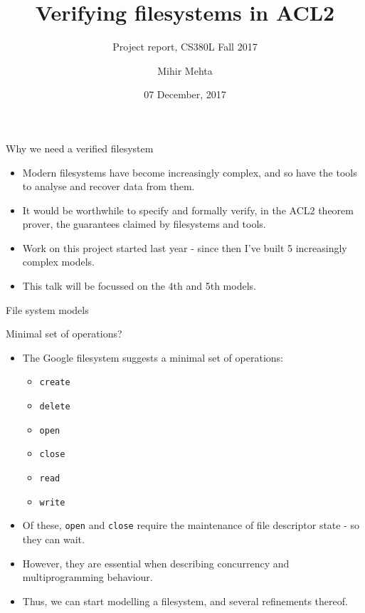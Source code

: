 \documentclass{beamer}
\title{Verifying filesystems in ACL2}
\subtitle{Project report, CS380L Fall 2017}
\author{Mihir Mehta}
\institute{
  Department of Computer Science\\
  University of Texas at Austin\\[1ex]
  \texttt{mihir@cs.utexas.edu}
}
\date{07 December, 2017}
\begin{document}
\begin{frame}[plain]
  \titlepage
\end{frame}


\begin{frame}{Why we need a verified filesystem}
  \begin{itemize}
  \item Modern filesystems have become increasingly complex, and so
    have the tools to analyse and recover data from them.
  \item It would be worthwhile to specify and formally verify, in the
    ACL2 theorem prover, the guarantees claimed by filesystems and
    tools.
  \item Work on this project started last year - since then I've built
    5 increasingly complex models.
  \item This talk will be focussed on the 4th and 5th models.
  \end{itemize}
\end{frame}

\begin{frame}{File system models}
\end{frame}

\begin{frame}{Minimal set of operations?}
  \begin{itemize}
  \item The Google filesystem suggests a minimal set of operations:
    \begin{itemize}
    \item \texttt{create}
    \item \texttt{delete}
    \item \texttt{open}
    \item \texttt{close}
    \item \texttt{read}
    \item \texttt{write}
    \end{itemize}
  \item Of these, \texttt{open} and \texttt{close} require the
    maintenance of file descriptor state - so they can wait.
  \item However, they are essential when describing concurrency and
    multiprogramming behaviour.
  \item Thus, we can start modelling a filesystem, and several
    refinements thereof.
  \end{itemize}
\end{frame}
\end{document}
